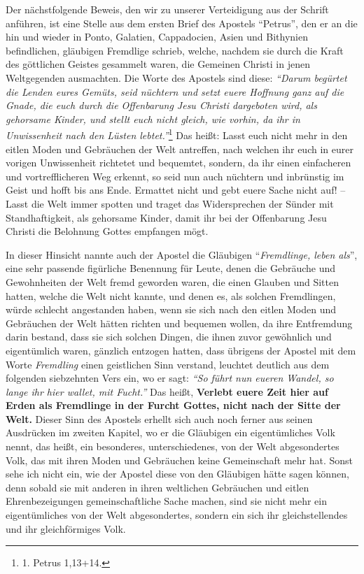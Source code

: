Der nächstfolgende Beweis, den wir zu unserer Verteidigung aus der Schrift
anführen, ist eine Stelle aus dem ersten Brief des Apostels "`Petrus"', den er
an die hin und wieder in Ponto, Galatien, Cappadocien, Asien und
Bithynien befindlichen, gläubigen Fremdlige schrieb, welche, nachdem sie
durch die Kraft des göttlichen Geistes gesammelt waren, die Gemeinen Christi
in jenen Weltgegenden ausmachten. Die Worte des Apostels sind diese:
\textit{"`Darum
begürtet die Lenden eures Gemüts, seid nüchtern und setzt euere Hoffnung ganz
auf die Gnade, die euch durch die Offenbarung Jesu Christi dargeboten wird,
als gehorsame Kinder, und stellt euch nicht gleich, wie vorhin, da ihr in
Unwissenheit nach den Lüsten lebtet."'}\footnote{1. Petrus 1,13+14.}
Das heißt:
Lasst euch nicht mehr in den eitlen Moden und Gebräuchen der Welt antreffen,
nach
welchen ihr euch in eurer vorigen Unwissenheit richtetet und bequemtet, sondern,
da ihr einen einfacheren und vortrefflicheren Weg erkennt, so seid nun auch
nüchtern und inbrünstig im Geist und hofft bis ans Ende. Ermattet nicht und
gebt euere Sache nicht auf! -- Lasst die Welt immer spotten und traget das
Widersprechen der Sünder mit Standhaftigkeit, als gehorsame Kinder, damit ihr
bei der Offenbarung Jesu Christi die Belohnung Gottes empfangen mögt.

\medskip


In dieser Hinsicht nannte auch der Apostel die Gläubigen "`\textit{Fremdlinge,
leben als}"', eine sehr
passende figürliche Benennung für Leute, denen die Gebräuche und Gewohnheiten
der Welt fremd geworden waren, die einen Glauben und Sitten hatten, welche die
Welt nicht kannte, und denen es, als solchen Fremdlingen, würde schlecht
angestanden haben, wenn sie sich nach den eitlen Moden und Gebräuchen der Welt
hätten richten und bequemen wollen, da ihre Entfremdung darin bestand, dass sie
sich solchen Dingen, die ihnen zuvor gewöhnlich und eigentümlich waren,
gänzlich entzogen hatten, dass übrigens der Apostel mit dem Worte
\textit{Fremdling}
einen geistlichen Sinn verstand, leuchtet deutlich aus dem folgenden siebzehnten
Vers ein, wo er sagt:
\textit{"`So führt nun eueren Wandel, so lange ihr hier wallet,
mit Fucht."'}
Das heißt, \textbf{Verlebt euere Zeit hier auf Erden als Fremdlinge in der
Furcht Gottes, nicht nach der Sitte der Welt.} Dieser Sinn des Apostels erhellt
sich
auch noch ferner aus seinen Ausdrücken im zweiten Kapitel, wo er die Gläubigen
ein eigentümliches Volk nennt, das heißt, ein besonderes, unterschiedenes, von
der
Welt abgesondertes Volk, das mit ihren Moden und Gebräuchen keine Gemeinschaft
mehr hat. Sonst sehe ich nicht ein, wie der Apostel diese von den Gläubigen
hätte sagen können, denn sobald sie mit anderen in ihren weltlichen Gebräuchen
und eitlen Ehrenbezeigungen gemeinschaftliche Sache machen, sind sie nicht mehr
ein eigentümliches von der Welt abgesondertes, sondern ein sich ihr
gleichstellendes und ihr gleichförmiges Volk.

